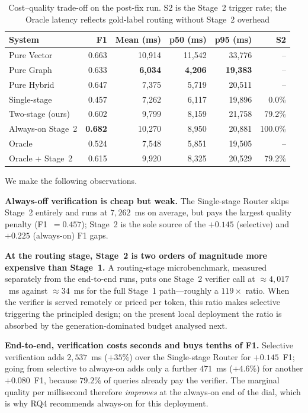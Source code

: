 \documentclass[pdflatex,sn-mathphys-num]{sn-jnl}
\begin{document}
\begin{table}[!htbp]
\centering
\caption{Cost--quality trade-off on the post-fix run. S2 is the Stage~2
trigger rate; the Oracle latency reflects gold-label routing without Stage~2
overhead}\label{tab:cost}
\small
\begin{tabular}{lrrrrr}
\toprule
\textbf{System} & \textbf{F1} & \textbf{Mean (ms)} & \textbf{p50 (ms)} & \textbf{p95 (ms)} & \textbf{S2} \\
\midrule
Pure Vector  & 0.663 & 10{,}914 & 11{,}542 & 33{,}776 & -- \\
Pure Graph   & 0.633 & \textbf{6{,}034} & \textbf{4{,}206} & \textbf{19{,}383} & -- \\
Pure Hybrid  & 0.647 & 7{,}375 & 5{,}719 & 20{,}511 & -- \\
Single-stage & 0.457 & 7{,}262 & 6{,}117 & 19{,}896 & 0.0\% \\
Two-stage (ours) & 0.602 & 9{,}799 & 8{,}159 & 21{,}758 & 79.2\% \\
Always-on Stage~2 & \textbf{0.682} & 10{,}270 & 8{,}950 & 20{,}881 & 100.0\% \\
\midrule
Oracle       & 0.524 & 7{,}548 & 5{,}851 & 19{,}505 & -- \\
Oracle + Stage~2 & 0.615 & 9{,}920 & 8{,}325 & 20{,}529 & 79.2\% \\
\bottomrule
\end{tabular}
\end{table}

We make the following observations.

\noindent\textbf{Always-off verification is cheap but weak.} The Single-stage
Router skips Stage~2 entirely and runs at $7{,}262$~ms on average, but pays
the largest quality penalty (F1~$=0.457$); Stage~2 is the sole source of the
$+0.145$ (selective) and $+0.225$ (always-on) F1 gaps.

\noindent\textbf{At the routing stage, Stage~2 is two orders of magnitude more
expensive than Stage~1.} A routing-stage microbenchmark, measured separately
from the end-to-end runs, puts one Stage~2 verifier call at
$\approx\!4{,}017$~ms against $\approx\!34$~ms for the full Stage~1
path---roughly a $119\times$ ratio. When the verifier is served remotely or
priced per token, this ratio makes selective triggering the principled
design; on the present local deployment the ratio is absorbed by the
generation-dominated budget analysed next.

\noindent\textbf{End-to-end, verification costs seconds and buys tenths of
F1.} Selective verification adds $2{,}537$~ms ($+35\%$) over the
Single-stage Router for $+0.145$~F1; going from selective to always-on adds
only a further $471$~ms ($+4.6\%$) for another $+0.080$~F1, because $79.2\%$
of queries already pay the verifier. The marginal quality per millisecond
therefore \emph{improves} at the always-on end of the dial, which is why RQ4
recommends always-on for this deployment.
\end{document}
